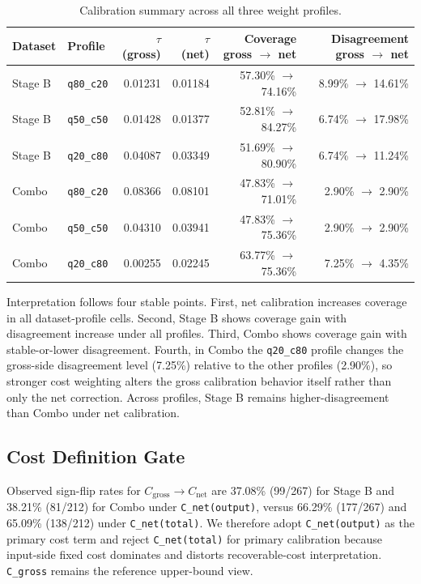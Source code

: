 \documentclass[11pt,a4paper]{article}
\begin{document}
\begin{table}[ht]
\centering
\small
\begin{tabular}{@{}llrrrr@{}}
\toprule
Dataset & Profile & $\tau$ (gross) & $\tau$ (net) & Coverage gross $\rightarrow$ net & Disagreement gross $\rightarrow$ net \\
\midrule
Stage B & \texttt{q80\_c20} & 0.01231 & 0.01184 & 57.30\% $\rightarrow$ 74.16\% & 8.99\% $\rightarrow$ 14.61\% \\
Stage B & \texttt{q50\_c50} & 0.01428 & 0.01377 & 52.81\% $\rightarrow$ 84.27\% & 6.74\% $\rightarrow$ 17.98\% \\
Stage B & \texttt{q20\_c80} & 0.04087 & 0.03349 & 51.69\% $\rightarrow$ 80.90\% & 6.74\% $\rightarrow$ 11.24\% \\
Combo & \texttt{q80\_c20} & 0.08366 & 0.08101 & 47.83\% $\rightarrow$ 71.01\% & 2.90\% $\rightarrow$ 2.90\% \\
Combo & \texttt{q50\_c50} & 0.04310 & 0.03941 & 47.83\% $\rightarrow$ 75.36\% & 2.90\% $\rightarrow$ 2.90\% \\
Combo & \texttt{q20\_c80} & 0.00255 & 0.02245 & 63.77\% $\rightarrow$ 75.36\% & 7.25\% $\rightarrow$ 4.35\% \\
\bottomrule
\end{tabular}
\caption{Calibration summary across all three weight profiles.}
\label{tab:e1_summary}
\end{table}

Interpretation follows four stable points. First, net calibration increases coverage in all dataset-profile cells. Second, Stage B shows coverage gain with disagreement increase under all profiles. Third, Combo shows coverage gain with stable-or-lower disagreement. Fourth, in Combo the \texttt{q20\_c80} profile changes the gross-side disagreement level (7.25\%) relative to the other profiles (2.90\%), so stronger cost weighting alters the gross calibration behavior itself rather than only the net correction. Across profiles, Stage B remains higher-disagreement than Combo under net calibration.

\subsection{Cost Definition Gate}
\label{sec:costgate}

Observed sign-flip rates for $C_{\mathrm{gross}} \rightarrow C_{\mathrm{net}}$ are 37.08\% (99/267) for Stage B and 38.21\% (81/212) for Combo under \texttt{C\_net(output)}, versus 66.29\% (177/267) and 65.09\% (138/212) under \texttt{C\_net(total)}. We therefore adopt \texttt{C\_net(output)} as the primary cost term and reject \texttt{C\_net(total)} for primary calibration because input-side fixed cost dominates and distorts recoverable-cost interpretation. \texttt{C\_gross} remains the reference upper-bound view.
\end{document}
